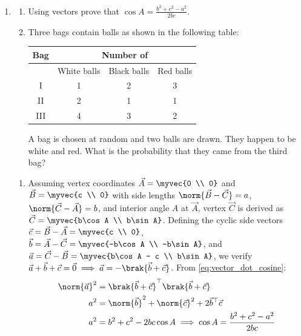 \begin{enumerate}[label=\thesubsection.\arabic*, ref=\thesubsection.\theenumi]
	\item \hfill {}
	\begin{enumerate}[label=\brak{\alph*}]
		\item Using vectors prove that $\cos A = \frac{b^2 + c^2 - a^2}{2bc}$.
		\item Three bags contain balls as shown in the following table:
		\begin{center}
			\begin{tabular}{|c|c|c|c|}
				\hline
				Bag & \multicolumn{3}{c|}{Number of} \\ \hline
				& White balls & Black balls & Red balls \\ \hline
				I & 1 & 2 & 3 \\
				II & 2 & 1 & 1 \\
				III & 4 & 3 & 2 \\ \hline
			\end{tabular}
		\end{center}
		A bag is chosen at random and two balls are drawn. They happen to be white and red. What is the probability that they came from the third bag?
	\end{enumerate}
	\solution
	\begin{enumerate}[label=\brak{\alph*}]
		\item Assuming vertex coordinates $\vec{A} = \myvec{0 \\ 0}$ and $\vec{B} = \myvec{c \\ 0}$ with side lengths $\norm{\vec{B} - \vec{C}} = a$, $\norm{\vec{C} - \vec{A}} = b$, and interior angle $A$ at $\vec{A}$, vertex $\vec{C}$ is derived as $\vec{C} = \myvec{b\cos A \\ b\sin A}$. Defining the cyclic side vectors $\vec{c} = \vec{B} - \vec{A} = \myvec{c \\ 0}$, $\vec{b} = \vec{A} - \vec{C} = \myvec{-b\cos A \\ -b\sin A}$, and $\vec{a} = \vec{C} - \vec{B} = \myvec{b\cos A - c \\ b\sin A}$, we verify $\vec{a} + \vec{b} + \vec{c} = \vec{0} \implies \vec{a} = -\brak{\vec{b} + \vec{c}}$. From \eqref{eq:vector_dot_cosine}:
		\begin{align}
			\norm{\vec{a}}^2 &= \brak{\vec{b} + \vec{c}}^{\top}\brak{\vec{b} + \vec{c}} \\
			a^2 &= \norm{\vec{b}}^2 + \norm{\vec{c}}^2 + 2\vec{b}^{\top}\vec{c} \\
			a^2 &= b^2 + c^2 - 2bc\cos A \implies \cos A = \frac{b^2 + c^2 - a^2}{2bc}
		\end{align}

\end{enumerate}
\end{enumerate}
